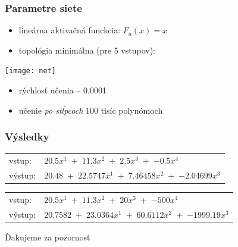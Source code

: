 \documentclass[red]{beamer}
\newcommand*\arc{{\fontfamily{pbk}\fontseries{db}\selectfont+}}
\begin{document}
\begin{frame}
\frametitle{Parametre siete}
\begin{center}
\begin{itemize}
\item lineárna aktivačná funckcia: $F_a(x)=x$
\item topológia minimálna (pre 5 vstupov):
\end{itemize}

\vspace*{0.5cm}
\texttt{[image: net]}

\begin{itemize}
\item rýchlosť učenia -- 0.0001
\item učenie \textit{po stĺpcoch} 100 tisíc polynómoch
\end{itemize}
\end{center} 
\end{frame}

\begin{frame}
\frametitle{Výsledky}

\vspace*{0.5cm}

\begin{tabular}{ l l }
		vstup: & $20.5x^1$~\arc~$11.3x^2$~\arc~$2.5x^3$~\arc~$-0.5x^4$\\
		výstup: & $20.48$~\arc~$22.5747x^1$~\arc~$7.46458x^2$~\arc~$-2.04699x^3$
\end{tabular}

\vspace*{1cm}

\begin{tabular}{ l l }
		vstup: & $20.5x^1$~\arc~$11.3x^2$~\arc~$20x^3$~\arc~$-500x^4$\\
		výstup: & $20.7582$~\arc~$23.0364x^1$~\arc~$60.6112x^2$~\arc~$-1999.19x^3$
\end{tabular}

\end{frame}

\begin{frame}
\begin{center}
\Huge Ďakujeme za pozornosť
\end{center}
\end{frame}
\end{document}
